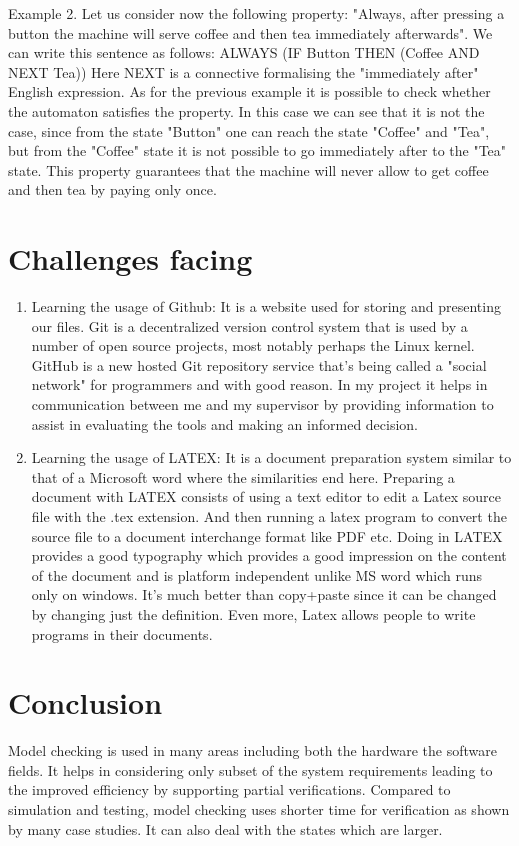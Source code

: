\documentclass{article}
\begin{document}
Example 2.
Let us consider now the following property: "Always, after pressing a button the machine will serve coffee and then tea immediately afterwards". We can write this sentence as follows:
ALWAYS (IF Button THEN (Coffee AND NEXT Tea))
Here NEXT is a connective formalising the "immediately after" English expression. As for the previous example it is possible to check whether the automaton satisfies the property. In this case we can see that it is not the case, since from the state "Button" one can reach the state "Coffee" and "Tea", but from the "Coffee" state it is not possible to go immediately after to the "Tea" state. This property guarantees that the machine will never allow to get coffee and then tea by paying only once.

\section{Challenges facing}
\begin{enumerate}

\item Learning the usage of Github: It is a website used for storing and presenting our files. Git is a decentralized version control system that is used by a number of open source projects, most notably perhaps the Linux kernel. GitHub is a new hosted Git repository service that's being called a "social network" for programmers and with good reason. In my project it helps in communication between me and my supervisor by providing information to assist in evaluating the tools and making an informed decision.

\item Learning the usage of LATEX: It is a document preparation system similar to that of a Microsoft word where the similarities end here. Preparing a document with LATEX consists of using a text editor to edit a Latex source file with the .tex extension. And then running a latex program to convert the source file to a document interchange format like PDF etc. Doing in LATEX provides a good typography which provides a good impression on the content of the document and is platform independent unlike MS word which runs only on windows. It's much better than copy+paste since it can be changed by changing just the definition. Even more, Latex allows people to write programs in their documents. 

\end{enumerate}



\section{Conclusion}
Model checking is used in many areas including both the hardware the software fields. It helps in considering only subset of the system requirements leading to the improved efficiency by supporting partial verifications. Compared to simulation and testing, model checking uses shorter time for verification as shown by many case studies. It can also deal with the states which are larger. 
\end{document}
